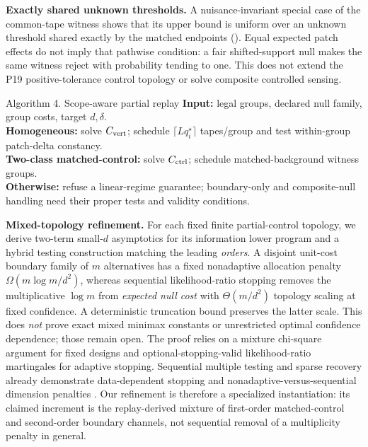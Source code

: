 \textbf{Exactly shared unknown thresholds.} A nuisance-invariant special case
of the common-tape witness shows that its upper bound is uniform over an unknown
threshold shared exactly by the matched endpoints
(). Equal expected patch effects do not imply
that pathwise condition: a fair shifted-support null makes the same witness
reject with probability tending to one. This does not extend the P19
positive-tolerance control topology or solve composite controlled sensing.

\begin{researchalgorithm}{Algorithm 4. Scope-aware partial replay}\label{alg:partial}
\textbf{Input:} legal groups, declared null family, group costs, target $d,\delta$.\\
\textbf{Homogeneous:} solve $C_{\rm vert}$; schedule $\lceil Lq_i^\star\rceil$ tapes/group and test within-group patch-delta constancy.\\
\textbf{Two-class matched-control:} solve $C_{\rm ctrl}$; schedule matched-background witness groups.\\
\textbf{Otherwise:} refuse a linear-regime guarantee; boundary-only and composite-null handling need their proper tests and validity conditions.
\end{researchalgorithm}

\textbf{Mixed-topology refinement.} For each fixed finite partial-control topology, we derive two-term small-$d$ asymptotics for its information lower program and a hybrid testing construction matching the leading \emph{orders}. A disjoint unit-cost boundary family of $m$ alternatives has a fixed nonadaptive allocation penalty $\Omega(m\log m/d^2)$, whereas sequential likelihood-ratio stopping removes the multiplicative $\log m$ from \emph{expected null cost} with $\Theta(m/d^2)$ topology scaling at fixed confidence. A deterministic truncation bound preserves the latter scale. This does \emph{not} prove exact mixed minimax constants or unrestricted optimal confidence dependence; those remain open. The proof relies on a mixture chi-square argument for fixed designs and optional-stopping-valid likelihood-ratio martingales for adaptive stopping.
Sequential multiple testing and sparse recovery already demonstrate data-dependent stopping and nonadaptive-versus-sequential dimension penalties \cite{MalekEtAl2017,MalloyNowak2014}.  Our refinement is therefore a specialized instantiation: its claimed increment is the replay-derived mixture of first-order matched-control and second-order boundary channels, not sequential removal of a multiplicity penalty in general.

